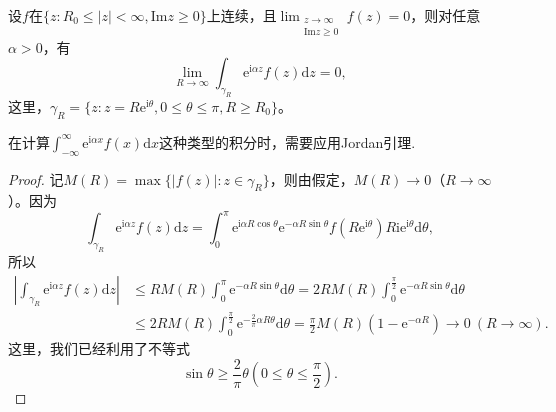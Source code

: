 \documentclass[../../main.tex]{subfiles}%
\begin{document}
\begin{lemma}[Jordan引理]\label{lemma:Jordan引理}
设$f$在$\{ z: R_0 \leqslant |z| < \infty, \mathrm{Im} z \geqslant 0 \}$上连续，且$\lim_{\substack{z \to \infty \\ \mathrm{Im} z \geqslant 0}} f(z) = 0$，则对任意$\alpha > 0$，有
\[
\lim_{R \to \infty} \int_{\gamma_R} \mathrm{e}^{\mathrm{i}\alpha z} f(z) \mathrm{d}z = 0,
\]
这里，$\gamma_R = \{ z: z = R\mathrm{e}^{\mathrm{i}\theta}, 0 \leqslant \theta \leqslant \pi, R \geqslant R_0 \}$。
\end{lemma}
\begin{remark}
在计算$\int_{-\infty}^{\infty} \mathrm{e}^{\mathrm{i}\alpha x} f(x) \mathrm{d}x$这种类型的积分时，需要应用Jordan引理.
\end{remark}
\begin{proof}

记$M(R) = \max\{ |f(z)| : z \in \gamma_R \}$，则由假定，$M(R) \to 0$（$R \to \infty$）。因为
\[
\int_{\gamma_R} \mathrm{e}^{\mathrm{i}\alpha z} f(z) \mathrm{d}z = \int_{0}^{\pi} \mathrm{e}^{\mathrm{i}\alpha R\cos\theta} \mathrm{e}^{-\alpha R\sin\theta} f(R\mathrm{e}^{\mathrm{i}\theta}) R\mathrm{i}\mathrm{e}^{\mathrm{i}\theta} \mathrm{d}\theta,
\]
所以
\begin{align*}
\left| \int_{\gamma_R} \mathrm{e}^{\mathrm{i}\alpha z} f(z) \mathrm{d}z \right| &\leqslant R M(R) \int_{0}^{\pi} \mathrm{e}^{-\alpha R\sin\theta} \mathrm{d}\theta
= 2 R M(R) \int_{0}^{\frac{\pi}{2}} \mathrm{e}^{-\alpha R\sin\theta} \mathrm{d}\theta
\\
&\leqslant 2 R M(R) \int_{0}^{\frac{\pi}{2}} \mathrm{e}^{-\frac{2}{\pi}\alpha R\theta} \mathrm{d}\theta
= \frac{\pi}{2} M(R) (1 - \mathrm{e}^{-\alpha R})
\to 0 \ (R \to \infty).
\end{align*}
这里，我们已经利用了不等式
\[
\sin\theta \geqslant \frac{2}{\pi}\theta \left( 0 \leqslant \theta \leqslant \frac{\pi}{2} \right).
\]

\end{proof}
\end{document}
